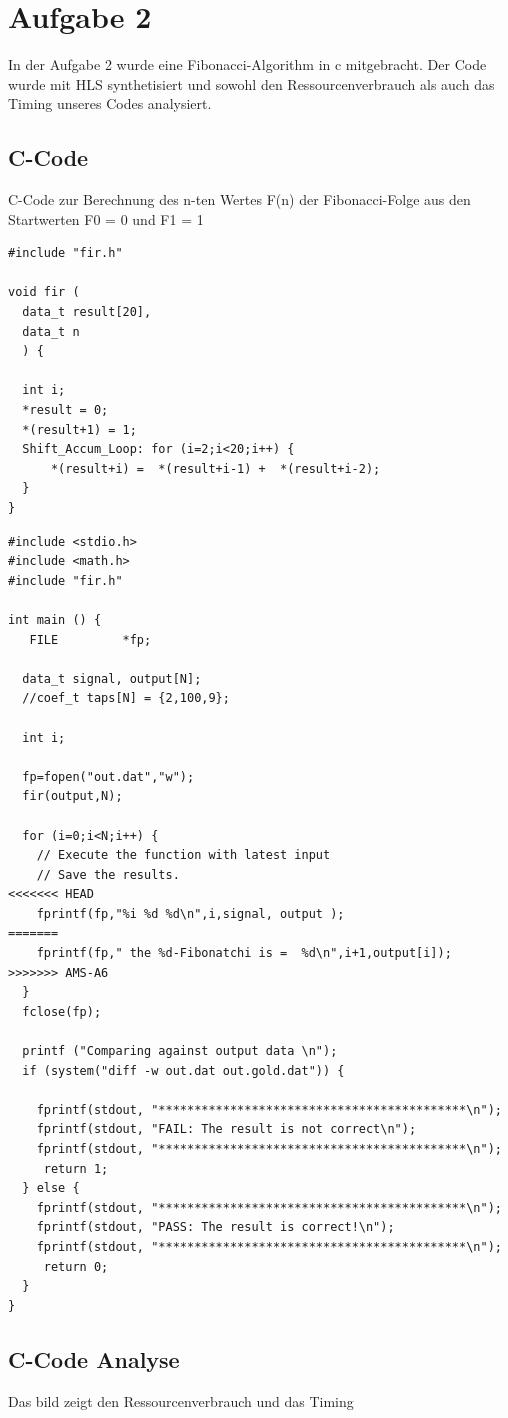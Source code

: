 \section{Aufgabe 2} \label{ex2}
In der Aufgabe 2 wurde eine Fibonacci-Algorithm in c mitgebracht. Der Code wurde mit HLS synthetisiert und sowohl den Ressourcenverbrauch als auch das Timing unseres Codes analysiert.

\subsection{C-Code}
C-Code zur Berechnung des n-ten Wertes F(n) der  Fibonacci-Folge aus den Startwerten F0 = 0 und F1 = 1\\

\begin{verbatim}
#include "fir.h"

void fir (
  data_t result[20],
  data_t n
  ) {

  int i;
  *result = 0;
  *(result+1) = 1;
  Shift_Accum_Loop: for (i=2;i<20;i++) {
	  *(result+i) =  *(result+i-1) +  *(result+i-2);
  }
}
\end{verbatim}
\begin{verbatim}
#include <stdio.h>
#include <math.h>
#include "fir.h"

int main () {
   FILE         *fp;

  data_t signal, output[N];
  //coef_t taps[N] = {2,100,9};

  int i;
  
  fp=fopen("out.dat","w");
  fir(output,N);

  for (i=0;i<N;i++) {
	// Execute the function with latest input
	// Save the results.
<<<<<<< HEAD
    fprintf(fp,"%i %d %d\n",i,signal, output );
=======
    fprintf(fp," the %d-Fibonatchi is =  %d\n",i+1,output[i]);
>>>>>>> AMS-A6
  }
  fclose(fp);

  printf ("Comparing against output data \n");
  if (system("diff -w out.dat out.gold.dat")) {

	fprintf(stdout, "*******************************************\n");
	fprintf(stdout, "FAIL: The result is not correct\n");
	fprintf(stdout, "*******************************************\n");
     return 1;
  } else {
	fprintf(stdout, "*******************************************\n");
	fprintf(stdout, "PASS: The result is correct!\n");
	fprintf(stdout, "*******************************************\n");
     return 0;
  }
}
\end{verbatim}

\subsection{C-Code Analyse}
Das bild zeigt den Ressourcenverbrauch und das Timing\\

